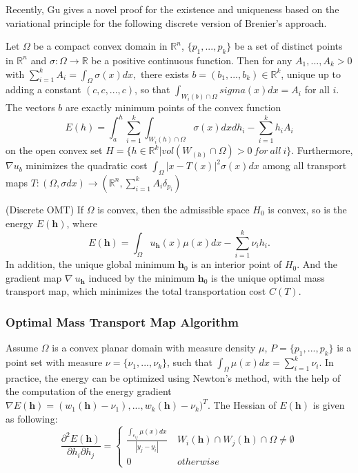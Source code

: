 \documentclass[runningheads]{llncs}
\begin{document}
Recently, Gu\cite{gu2013variational} gives a novel proof for the existence and uniqueness based on the variational principle for the following discrete version of Brenier's approach.
\begin{theorem}
Let $\Omega$ be a compact convex domain in $\mathbb{R}^n$, $\{p_1,...,p_k\}$ be a set of distinct points in $\mathbb{R}^n$ and $\sigma:\Omega\rightarrow \mathbb{R}$ be a positive continuous function. Then for any $A_1,...,A_k>0$ with $\sum^k_{i=1}A_i=\int_{\Omega}\sigma(x)dx,$ there exists $b=(b_1,...,b_k)\in \mathbb{R}^k$, unique up to adding a constant $(c,c,...,c)$, so that $\int_{W_i(b)\cap \Omega}sigma(x)dx=A_i$ for all $i$. The vectors $b$ are exactly minimum points of the convex function $$E(h)=\int^h_a\sum^k_{i=1}\int_{W_i(h)\cap\Omega}\sigma(x)dxdh_i-\sum^k_{i=1}h_iA_i$$ on the open convex set $H=\{h\in\mathbb{R}^k|vol(W_(h)\cap \Omega)>0\ for\ all\ i\}$. Furthermore, $\nabla u_b$ minimizes the quadratic cost $\int_\Omega|x-T(x)|^2\sigma(x)dx$ among all transport maps $T:(\Omega,\sigma dx)\rightarrow(\mathbb{R}^n,\sum^k_{i=1}A_i\delta_{p_i})$
\end{theorem}
\begin{theorem}
(Discrete OMT) If $\Omega$ is convex, then the admissible space $H_0$ is convex, so is the energy $E(\mathbf{h})$, where $$E(\mathbf{h})=\int_\Omega u_\mathbf{h}(x)\mu(x)dx-\sum^k_{i=1}\nu_i h_i.$$ In addition, the unique global minimum $\mathbf{h}_0$ is an interior point of $H_0$. And the gradient map $ \nabla\ u_\mathbf{h}$ induced by the minimum $\mathbf{h}_0$ is the unique optimal mass transport map, which minimizes the total transportation cost $C(T)$.
\end{theorem}



\subsubsection{Optimal Mass Transport Map Algorithm}
Assume $\Omega$ is a convex planar domain with measure density $\mu$, $P=\{p_1,...,p_k\}$ is a point set with measure $\nu=\{\nu_1,...,\nu_k\}$, such that $\int_\Omega \mu(x)dx=\sum^k_{i=1}\nu_i$. In practice, the energy can be optimized using Newton's method, with the help of the computation of the energy gradient$\nabla E(\mathbf{h})=(w_1(\mathbf{h})-\nu_1),...,w_k(\mathbf{h})-\nu_k)^T$. The Hessian of $E(\mathbf{h})$ is given as following:
\[
\dfrac{\partial ^2E(\mathbf{h})}{\partial h_i\partial h_j}=\begin{cases}
					\frac{\int_{e_{ij}}\mu(x)dx}{|y_j-y_i|}\ &W_i(\mathbf{h})\cap W_j(\mathbf{h})\cap \Omega\neq\emptyset \\
					0 &otherwise
\end{cases}
\]
\end{document}
